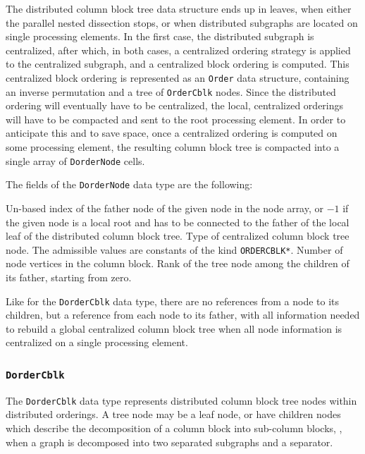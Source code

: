 The distributed column block tree data structure ends up in leaves,
when either the parallel nested dissection stops, or when distributed
subgraphs are located on single processing elements. In the first
case, the distributed subgraph is centralized, after which, in both
cases, a centralized ordering strategy is applied to the centralized
subgraph, and a centralized block ordering is computed. This
centralized block ordering is represented as an \texttt{Order}
data structure, containing an inverse permutation and a tree of
\texttt{Order\lbt Cblk} nodes. Since the distributed ordering will
eventually have to be centralized, the local, centralized orderings
will have to be compacted and sent to the root processing
element. In order to anticipate this and to save space, once a
centralized ordering is computed on some processing element, the
resulting column block tree is compacted into a single array of
\texttt{Dorder\lbt Node} cells.

The fields of the \texttt{DorderNode} data type are the following:
\begin{itemize}
  Un-based index of the father node of the given node in the node
  array, or $-1$ if the given node is a local root and has to be
  connected to the father of the local leaf of the distributed column
  block tree.
  Type of centralized column block tree node. The admissible values
  are constants of the kind \texttt{ORDERCBLK*}.
  Number of node vertices in the column block.
  Rank of the tree node among the children of its father, starting
  from zero.
\end{itemize}

Like for the \texttt{Dorder\lbt Cblk} data type, there are no
references from a node to its children, but a reference from each node
to its father, with all information needed to rebuild a global
centralized column block tree when all node information is centralized
on a single processing element.

\subsubsection{\texttt{DorderCblk}}
\label{sec-data-dorder-cblk}

The \texttt{DorderCblk} data type represents distributed column block
tree nodes within distributed orderings. A tree node may be a leaf
node, or have children nodes which describe the decomposition of a
column block into sub-column blocks, \eg, when a graph is decomposed
into two separated subgraphs and a separator.

